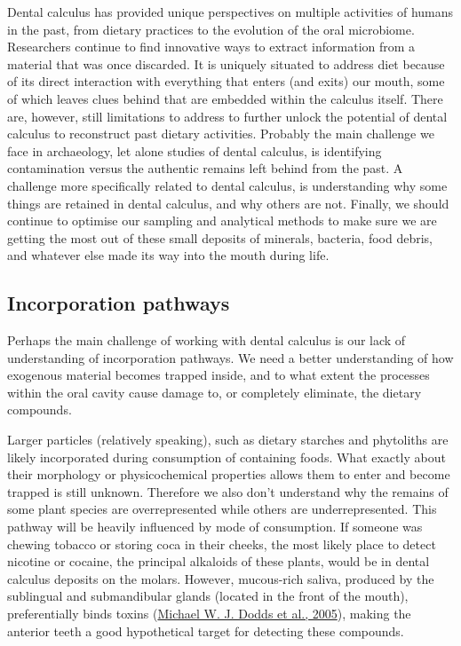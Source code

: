 \documentclass[
  letterpaper,
]{book}
\begin{document}
Dental calculus has provided unique perspectives on multiple activities
of humans in the past, from dietary practices to the evolution of the
oral microbiome. Researchers continue to find innovative ways to extract
information from a material that was once discarded. It is uniquely
situated to address diet because of its direct interaction with
everything that enters (and exits) our mouth, some of which leaves clues
behind that are embedded within the calculus itself. There are, however,
still limitations to address to further unlock the potential of dental
calculus to reconstruct past dietary activities. Probably the main
challenge we face in archaeology, let alone studies of dental calculus,
is identifying contamination versus the authentic remains left behind
from the past. A challenge more specifically related to dental calculus,
is understanding why some things are retained in dental calculus, and
why others are not. Finally, we should continue to optimise our sampling
and analytical methods to make sure we are getting the most out of these
small deposits of minerals, bacteria, food debris, and whatever else
made its way into the mouth during life.

\hypertarget{incorporation-pathways}{%
\subsection{Incorporation pathways}\label{incorporation-pathways}}

Perhaps the main challenge of working with dental calculus is our lack
of understanding of incorporation pathways. We need a better
understanding of how exogenous material becomes trapped inside, and to
what extent the processes within the oral cavity cause damage to, or
completely eliminate, the dietary compounds.

Larger particles (relatively speaking), such as dietary starches and
phytoliths are likely incorporated during consumption of containing
foods. What exactly about their morphology or physicochemical properties
allows them to enter and become trapped is still unknown. Therefore we
also don't understand why the remains of some plant species are
overrepresented while others are underrepresented. This pathway will be
heavily influenced by mode of consumption. If someone was chewing
tobacco or storing coca in their cheeks, the most likely place to detect
nicotine or cocaine, the principal alkaloids of these plants, would be
in dental calculus deposits on the molars. However, mucous-rich saliva,
produced by the sublingual and submandibular glands (located in the
front of the mouth), preferentially binds toxins
(\protect\hyperlink{ref-doddsHealthBenefits2005}{Michael W. J. Dodds et
al., 2005}), making the anterior teeth a good hypothetical target for
detecting these compounds.
\end{document}
